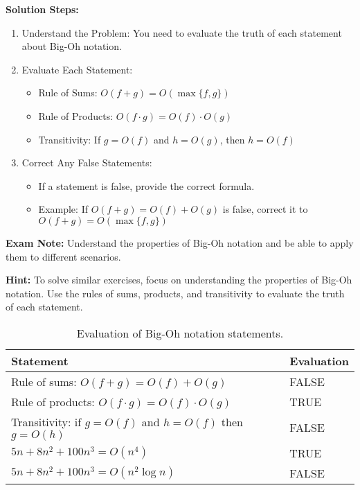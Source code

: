 \vspace{0.5em}
\textbf{Solution Steps:}
\begin{enumerate}[leftmargin=*,noitemsep]
    \item Understand the Problem: You need to evaluate the truth of each statement about Big-Oh notation.
    \item Evaluate Each Statement:
    \begin{itemize}
        \item Rule of Sums: $O(f + g) = O(\max\{f, g\})$
        \item Rule of Products: $O(f \cdot g) = O(f) \cdot O(g)$
        \item Transitivity: If $g = O(f)$ and $h = O(g)$, then $h = O(f)$
    \end{itemize}
    \item Correct Any False Statements:
    \begin{itemize}
        \item If a statement is false, provide the correct formula.
        \item Example: If $O(f + g) = O(f) + O(g)$ is false, correct it to $O(f + g) = O(\max\{f, g\})$
    \end{itemize}
\end{enumerate}

\textbf{Exam Note:} Understand the properties of Big-Oh notation and be able to apply them to different scenarios.

\textbf{Hint:} To solve similar exercises, focus on understanding the properties of Big-Oh notation. Use the rules of sums, products, and transitivity to evaluate the truth of each statement.

\begin{table}[H]
    \centering
    \small
    \begin{tabularx}{\linewidth}{|>{\hsize=0.6\hsize}X|>{\hsize=0.4\hsize}X|}
    \hline
    \textbf{Statement} & \textbf{Evaluation} \\
    \hline
    Rule of sums: $O(f + g) = O(f) + O(g)$ & FALSE \\
    \hline
    Rule of products: $O(f \cdot g) = O(f) \cdot O(g)$ & TRUE \\
    \hline
    Transitivity: if $g = O(f)$ and $h = O(f)$ then $g = O(h)$ & FALSE \\
    \hline
    $5n + 8n^2 + 100n^3 = O(n^4)$ & TRUE \\
    \hline
    $5n + 8n^2 + 100n^3 = O(n^2 \log n)$ & FALSE \\
    \hline
    \end{tabularx}
    \caption{Evaluation of Big-Oh notation statements.}
\end{table}

